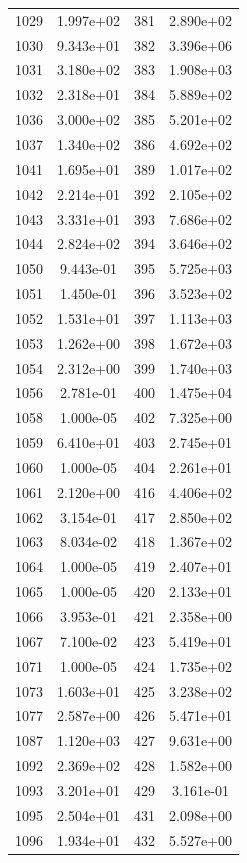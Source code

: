 \documentclass[12pt]{article}
\begin{document}
\begin{longtable}{@{}cccc@{}}
1029 & 1.997e+02 & 381 & 2.890e+02 \\
1030 & 9.343e+01 & 382 & 3.396e+06 \\
1031 & 3.180e+02 & 383 & 1.908e+03 \\
1032 & 2.318e+01 & 384 & 5.889e+02 \\
1036 & 3.000e+02 & 385 & 5.201e+02 \\
1037 & 1.340e+02 & 386 & 4.692e+02 \\
1041 & 1.695e+01 & 389 & 1.017e+02 \\
1042 & 2.214e+01 & 392 & 2.105e+02 \\
1043 & 3.331e+01 & 393 & 7.686e+02 \\
1044 & 2.824e+02 & 394 & 3.646e+02 \\
1050 & 9.443e-01 & 395 & 5.725e+03 \\
1051 & 1.450e-01 & 396 & 3.523e+02 \\
1052 & 1.531e+01 & 397 & 1.113e+03 \\
1053 & 1.262e+00 & 398 & 1.672e+03 \\
1054 & 2.312e+00 & 399 & 1.740e+03 \\
1056 & 2.781e-01 & 400 & 1.475e+04 \\
1058 & 1.000e-05 & 402 & 7.325e+00 \\
1059 & 6.410e+01 & 403 & 2.745e+01 \\
1060 & 1.000e-05 & 404 & 2.261e+01 \\
1061 & 2.120e+00 & 416 & 4.406e+02 \\
1062 & 3.154e-01 & 417 & 2.850e+02 \\
1063 & 8.034e-02 & 418 & 1.367e+02 \\
1064 & 1.000e-05 & 419 & 2.407e+01 \\
1065 & 1.000e-05 & 420 & 2.133e+01 \\
1066 & 3.953e-01 & 421 & 2.358e+00 \\
1067 & 7.100e-02 & 423 & 5.419e+01 \\
1071 & 1.000e-05 & 424 & 1.735e+02 \\
1073 & 1.603e+01 & 425 & 3.238e+02 \\
1077 & 2.587e+00 & 426 & 5.471e+01 \\
1087 & 1.120e+03 & 427 & 9.631e+00 \\
1092 & 2.369e+02 & 428 & 1.582e+00 \\
1093 & 3.201e+01 & 429 & 3.161e-01 \\
1095 & 2.504e+01 & 431 & 2.098e+00 \\
1096 & 1.934e+01 & 432 & 5.527e+00 \\

\end{longtable}
\end{document}
